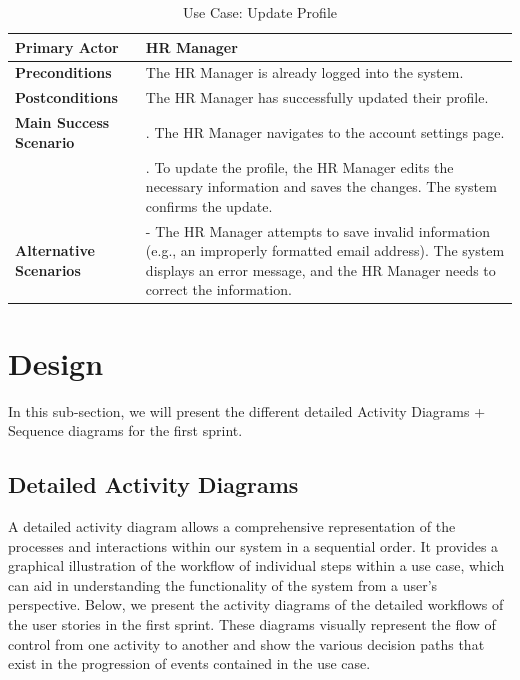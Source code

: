 \begin{table}[H]
    \renewcommand{\arraystretch}{1.5}%
    \caption{Use Case: Update Profile }
    \centering
    \medskip
    \begin{tabularx}{\textwidth} {
            | >{\hsize=0.5\hsize\raggedright\arraybackslash}X
            | >{\hsize=1.5\hsize\raggedright\arraybackslash}X |}
        \hline
        \textbf{Primary Actor} & HR Manager \\
        \hline
        \textbf{Preconditions} & The HR Manager is already logged into the system. \\
        \hline
        \textbf{Postconditions} & The HR Manager has successfully updated their profile. \\
        \hline
        \textbf{Main Success Scenario} & 1. The HR Manager navigates to the account settings page. \\
        & 2. To update the profile, the HR Manager edits the necessary information and saves the changes. The system confirms the update. \\
        \hline
        \textbf{Alternative Scenarios} & - The HR Manager attempts to save invalid information (e.g., an improperly formatted email address). The system displays an error message, and the HR Manager needs to correct the information. \\
        \hline
    \end{tabularx}
\end{table}



\section{Design} 
In this sub-section, we will present the different detailed Activity Diagrams + Sequence diagrams for the first sprint.

\subsection{Detailed Activity Diagrams}

A detailed activity diagram allows a comprehensive representation of the processes and interactions within our system in a sequential order. 
It provides a graphical illustration of the workflow of individual steps within a use case, which can aid in understanding the functionality of the system from a user's perspective. Below, we present the activity diagrams of the detailed workflows of the user stories in the first sprint. 
These diagrams visually represent the flow of control from one activity to another and show the various decision paths that exist in the progression of events contained in the use case.

